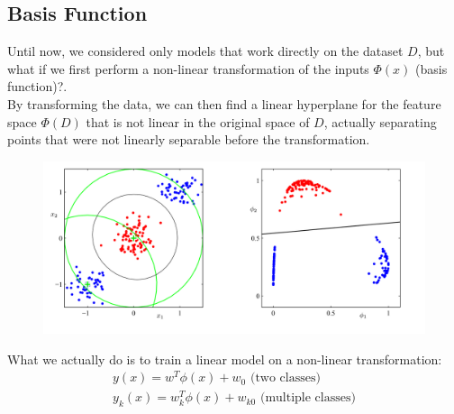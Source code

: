 \subsection{Basis Function}
Until now, we considered only models that work directly on the dataset $D$, but what if we first perform a non-linear transformation of the inputs $\Phi  (x)$ (basis function)?.\\
By transforming the data, we can then find a linear hyperplane for the feature space $\Phi (D)$ that is not linear in the original space of $D$, actually separating points that were not linearly separable before the transformation.


\begin{figure}[H]
    \centering
    \includegraphics[width=15cm]{images/Probabilistic Models/phi_on_dataset.png}
    \caption{}
    \label{fig:phi_on_dataset}
\end{figure}

What we actually do is to train a linear model on a non-linear transformation:
\begin{equation}
    \begin{multlined}
    y(x) = w^{T}\phi(x) + w_{0} \text{    (two classes)} \\
    y_{k}(x) = w_{k}^{T}\phi(x) + w_{k0}\text{    (multiple\ classes)} \\
    \end{multlined}
\end{equation}

